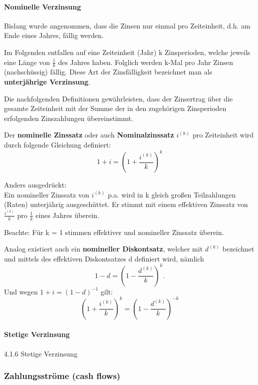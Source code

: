 \documentclass[
]{article}
\begin{document}
\hypertarget{nominelle-verzinsung}{%
\paragraph{Nominelle Verzinsung}\label{nominelle-verzinsung}}

Bislang wurde angenommen, dass die Zinsen nur einmal pro Zeiteinheit,
d.h. am Ende eines Jahres, fällig werden.

Im Folgenden entfallen auf eine Zeiteinheit (Jahr) k Zinsperioden,
welche jeweils eine Länge von \(\frac{1}{k}\) des Jahres haben. Folglich
werden k-Mal pro Jahr Zinsen (nachschüssig) fällig. Diese Art der
Zinsfälligkeit bezeichnet man als \textbf{unterjährige Verzinsung}.

Die nachfolgenden Definitionen gewährleisten, dass der Zinsertrag über
die gesamte Zeiteinheit mit der Summe der in den zugehörigen
Zinsperioden erfolgenden Zinszahlungen übereinstimmt.

Der \textbf{nominelle Zinssatz} oder auch \textbf{Nominalzinssatz}
\(i^{(k)}\) pro Zeiteinheit wird durch folgende Gleichung definiert: \[
  1 + i = \left(1+\frac{i^{(k)}}{k}\right)^k
\]

Anders ausgedrückt:\\
Ein nomineller Zinssatz von \(i^{(k)}\) p.a. wird in k gleich großen
Teilzahlungen (Raten) unterjährig ausgeschüttet. Er stimmt mit einem
effektiven Zinssatz von \(\frac{i^{(k)}}{k}\) pro \(\frac{1}{k}\) eines
Jahres überein.

Beachte: Für k = 1 stimmen effektiver und nomineller Zinssatz überein.

Analog existiert auch ein \textbf{nomineller Diskontsatz}, welcher mit
\(d^{(k)}\) bezeichnet und mittels des effektiven Diskontsatzes d
definiert wird, nämlich\\
\[
  1-d = \left(1-\frac{d^{(k)}}{k}\right)^k.
\] Und wegen \(1+i = (1-d)^{-1}\) gilt: \[
  \left(1+\frac{i^{(k)}}{k}\right)^{k} = \left(1-\frac{d^{(k)}}{k}\right)^{-k}
\]

\hypertarget{stetige-verzinsung}{%
\paragraph{Stetige Verzinsung}\label{stetige-verzinsung}}

4.1.6 Stetige Verzinsung

\hypertarget{zahlungsstruxf6me-cash-flows}{%
\subsubsection{Zahlungsströme (cash
flows)}\label{zahlungsstruxf6me-cash-flows}}
\end{document}
